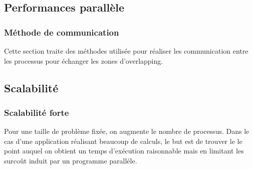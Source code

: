 

\subsection{Performances parallèle}


\subsubsection{Méthode de communication}
Cette section traite des méthodes utilisée pour réaliser les communication entre les processus pour échanger les zones d'overlapping.











\subsection{Scalabilité}

\subsubsection{Scalabilité forte}
Pour une taille de problème fixée, on augmente le nombre de processus. Dans le cas d'une application réalisant beaucoup de calculs, le but est de trouver le le point auquel on obtient un temps d'exécution raisonnable mais en limitant les surcoût induit par un programme paralléle. 	

